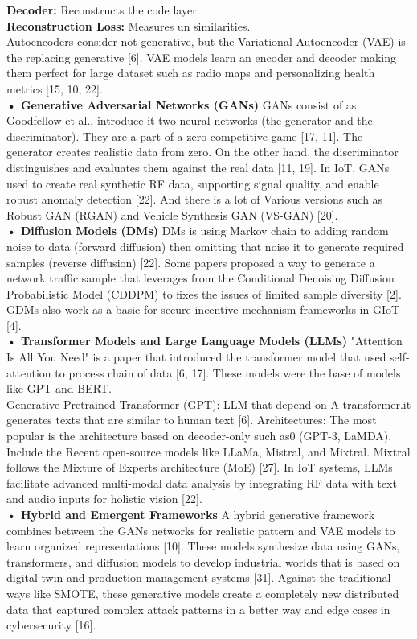 \documentclass[journal]{IEEEtran}
\begin{document}
\textbf{Decoder:} Reconstructs the code layer.\\
\textbf{Reconstruction Loss:} Measures un similarities.\\
Autoencoders consider not generative, but the Variational Autoencoder (VAE) is the replacing generative [6]. VAE models learn an encoder and decoder making them perfect for large dataset such as radio maps and personalizing health metrics [15, 10, 22].\\
\textbf{• Generative Adversarial Networks (GANs)}
GANs consist of as Goodfellow et al., introduce it two neural networks (the generator and the discriminator). They are a part of a zero competitive game [17, 11]. The generator creates realistic data from zero. On the other hand, the discriminator distinguishes and evaluates them against the real data [11, 19]. In IoT, GANs used to create real synthetic RF data, supporting signal quality, and enable robust anomaly detection [22]. And there is a lot of Various versions such as Robust GAN (RGAN) and Vehicle Synthesis GAN (VS-GAN) [20].\\
\textbf{• Diffusion Models (DMs)}
DMs is using Markov chain to adding random noise to data (forward diffusion) then omitting that noise it to generate required samples (reverse diffusion) [22]. Some papers proposed a way to generate a network traffic sample that leverages from the Conditional Denoising Diffusion Probabilistic Model (CDDPM) to fixes the issues of limited sample diversity [2]. GDMs also work as a basic for secure incentive mechanism frameworks in GIoT [4].\\
\textbf{• Transformer Models and Large Language Models (LLMs)}
"Attention Is All You Need" is a paper that introduced the transformer model that used self-attention to process chain of data [6, 17]. These models were the base of models like GPT and BERT.\\
Generative Pretrained Transformer (GPT): LLM that depend on A transformer.it generates texts that are similar to human text [6].
Architectures: The most popular is the architecture based on decoder-only such as0 (GPT-3, LaMDA). Include the Recent open-source models like LLaMa, Mistral, and Mixtral. Mixtral follows the Mixture of Experts architecture (MoE) [27].
In IoT systems, LLMs facilitate advanced multi-modal data analysis by integrating RF data with text and audio inputs for holistic vision [22].\\
\textbf{• Hybrid and Emergent Frameworks}
A hybrid generative framework combines between the GANs networks for realistic pattern and VAE models to learn organized representations [10]. These models synthesize data using GANs, transformers, and diffusion models to develop industrial worlds that is based on digital twin and production management systems [31]. Against the traditional ways like SMOTE, these generative models create a completely new distributed data that captured complex attack patterns in a better way and edge cases in cybersecurity [16].
\end{document}

